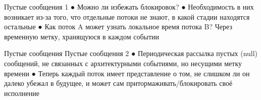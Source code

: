 \documentclass{beamer}
\begin{document}
\begin{frame}{}
Пустые сообщения 1
●
 Можно ли избежать блокировок?
●
 Необходимость в них возникает из-за того,
что отдельные потоки не знают, в какой
стадии находятся остальные
●
 Как поток A может узнать локальное время
потока B? Через временную метку,
хранящуюся в каждом событии

\end{frame}

\begin{frame}{Пустые сообщения}
Пустые сообщения 2
●
 Периодическая рассылка пустых (null)
сообщений, не связанных с
архитектурными событиями, но несущими
метку времени
●
 Теперь каждый поток имеет представление
о том, не слишком ли он далеко убежал в
будущее, и может сам
притормаживать/блокировать своё
исполнение

\end{frame}
\end{document}
